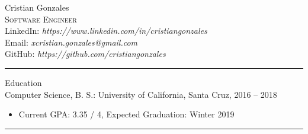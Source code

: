 \documentclass{res}
\begin{document}
\begin{resume}

{\Huge Cristian Gonzales}\\
\vspace{2mm}
\textsc{\large Software Engineer}\\
LinkedIn: \textit{https://www.linkedin.com/in/cristiangonzales}\\
Email: \textit{xcristian.gonzales@gmail.com}\\
GitHub: \textit{https://github.com/cristiangonzales}\\

\hrule width18.5cm

{\huge Education}\\[2mm]
{\Large Computer Science, B. S.: University of California, Santa Cruz, 2016 -- 2018}\\
	\begin{itemize}
		\vspace{-3mm}
		\item Current GPA: 3.35 / 4, Expected Graduation: Winter 2019
	\end{itemize}
\vspace{-1mm}
\leavevmode

\hrule width18.5cm


\end{resume}
\end{document}
